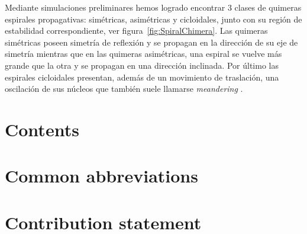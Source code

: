 Mediante simulaciones preliminares hemos logrado encontrar 3 clases de quimeras espirales propagativas: simétricas, asimétricas y cicloidales, junto con su región de estabilidad correspondiente, ver figura~\ref{fig:SpiralChimera}. Las quimeras simétricas poseen simetría de reflexión y se propagan en la dirección de su eje de simetría mientras que en las quimeras asimétricas, una espiral se vuelve más grande que la otra y se propagan en una dirección inclinada. Por último las espirales cicloidales presentan, además de un movimiento de traslación, una oscilación de sus núcleos que también suele llamarse {\em meandering} \cite{SC:Bataille}.

\section{Contents}

\section{Common abbreviations}
\section{Contribution statement}